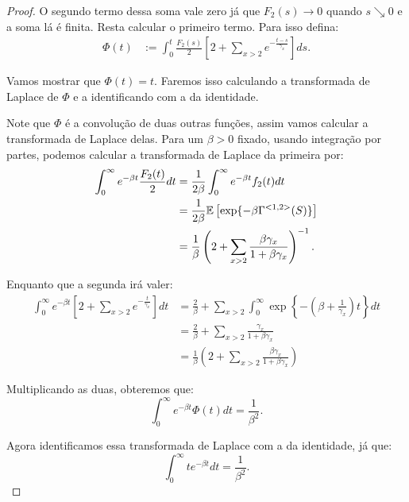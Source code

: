 \begin{proof}
  O segundo termo dessa soma vale zero já que $F_2(s) \to 0$ quando $s
  \searrow 0$ e a soma lá é finita. Resta calcular o primeiro
  termo. Para isso defina:
  \begin{align*}
    \Phi(t) &:= \int_0^t \frac{F_2(s)}{2} \left[
      2 + \sum_{x > 2} e^{-\frac{t-s}{\gamma_x}}
    \right] ds.
  \end{align*}

  Vamos mostrar que $\Phi(t) = t$. Faremos isso calculando a
  transformada de Laplace de $\Phi$ e a identificando com a da
  identidade.

  Note que $\Phi$ é a convolução de duas outras funções, assim vamos
  calcular a transformada de Laplace delas. Para um $\beta > 0$
  fixado, usando integração por partes, podemos calcular a transformada
  de Laplace da primeira por:
  \begin{align*}
    \int_0^{\infty} e^{-\beta t} \frac{F_2(t)}{2} dt 
    &= \frac{1}{2 \beta} \int_0^\infty e^{-\beta t}  f_2(t) dt\\
    &= \frac{1}{2 \beta}
    {\mathbb{E}} \left[ \exp \{-\beta \Gamma^{<1,2>} (S)\}  \right]\\
    &= \frac{1}{\beta}
    \left( 2 + \sum_{x > 2}
      \frac{\beta\gamma_x}{1 + \beta \gamma_x}  \right)^{-1}.
  \end{align*}

  Enquanto que a segunda irá valer:
  \begin{align*}
    \int_0^{\infty} e^{-\beta t} \left[
      2 + \sum_{x > 2} e^{-\frac{t}{\gamma_x}}
    \right]  dt 
    &= \frac{2}{\beta} + \sum_{x > 2} \int_0^\infty \exp \left\{
      - \left(\beta + \frac{1}{\gamma_x} \right) t \right\} dt\\
    &= \frac{2}{\beta} + \sum_{x > 2} \frac{\gamma_x}{1 +
      \beta\gamma_x}\\
    &= \frac{1}{\beta} \left(
      2 + \sum_{x > 2} \frac{\beta\gamma_x}{1 +
      \beta\gamma_x}
    \right)
  \end{align*}

  Multiplicando as duas, obteremos que:
  \begin{displaymath}
    \int_0^\infty e^{- \beta t} \Phi(t) dt = \frac{1}{\beta^2}.
  \end{displaymath}

  Agora identificamos essa transformada de Laplace com a da
  identidade, já que:
  \begin{displaymath}
    \int_0^\infty t e^{- \beta t}  d t = \frac{1}{\beta^2}.
  \end{displaymath}



\end{proof}
